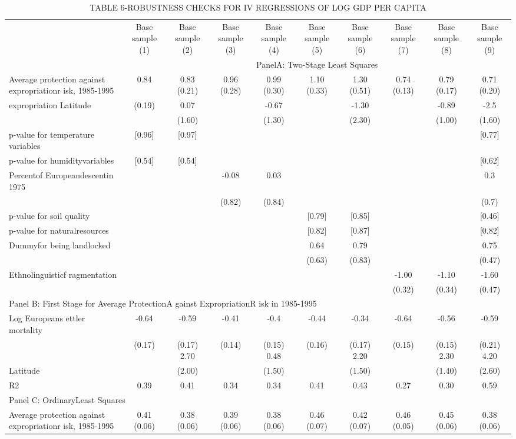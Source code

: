 \begin{table}[htbp]
\centering
\caption{TABLE  6-ROBUSTNESS CHECKS  FOR  IV REGRESSIONS OF LOG GDP PER  CAPITA}
\begin{tabular}{lccccccccc}
\hline
 & Base sample (1) & Base sample (2) & Base sample (3) & Base sample (4) & Base sample (5) & Base sample (6) & Base sample (7) & Base sample (8) & Base sample (9) \\
 & \multicolumn{9}{c}{PanelA: Two-Stage Least Squares} \\
Average protection against expropriationr isk, 1985-1995 & 0.84 & 0.83 (0.21) & 0.96 (0.28) & 0.99 (0.30) & 1.10 (0.33) & 1.30 (0.51) & 0.74 (0.13) & 0.79 (0.17) & 0.71 (0.20) \\
expropriation Latitude & (0.19) & 0.07 &  & -0.67 &  & -1.30 &  & -0.89 & -2.5 \\
 &  & (1.60) &  & (1.30) &  & (2.30) &  & (1.00) & (1.60) \\
p-value for temperature variables & [0.96] & [0.97] &  &  &  &  &  &  & [0.77] \\
p-value for humidityvariables & [0.54] & [0.54] &  &  &  &  &  &  & [0.62] \\
Percentof Europeandescentin 1975 &  &  & -0.08 & 0.03 &  &  &  &  & 0.3 \\
 &  &  & (0.82) & (0.84) &  &  &  &  & (0.7) \\
p-value for soil quality &  &  &  &  & [0.79] & [0.85] &  &  & [0.46] \\
p-value for naturalresources &  &  &  &  & [0.82] & [0.87] &  &  & [0.82] \\
Dummyfor being landlocked &  &  &  &  & 0.64 & 0.79 &  &  & 0.75 \\
 &  &  &  &  & (0.63) & (0.83) &  &  & (0.47) \\
Ethnolinguisticf ragmentation &  &  &  &  &  &  & -1.00 & -1.10 & -1.60 \\
 &  &  &  &  &  &  & (0.32) & (0.34) & (0.47) \\
\multicolumn{10}{l}{Panel B: First Stage for Average ProtectionA gainst ExpropriationR isk in 1985-1995} \\
Log Europeans ettler mortality & -0.64 & -0.59 & -0.41 & -0.4 & -0.44 & -0.34 & -0.64 & -0.56 & -0.59 \\
 & (0.17) & (0.17) 2.70 & (0.14) & (0.15) 0.48 & (0.16) & (0.17) 2.20 & (0.15) & (0.15) 2.30 & (0.21) 4.20 \\
Latitude &  & (2.00) &  & (1.50) &  & (1.50) &  & (1.40) & (2.60) \\
R2 & 0.39 & 0.41 & 0.34 & 0.34 & 0.41 & 0.43 & 0.27 & 0.30 & 0.59 \\
\multicolumn{10}{l}{Panel C: OrdinaryLeast Squares} \\
Average protection against expropriationr isk, 1985-1995 & 0.41 (0.06) & 0.38 (0.06) & 0.39 (0.06) & 0.38 (0.06) & 0.46 (0.07) & 0.42 (0.07) & 0.46 (0.05) & 0.45 (0.06) & 0.38 (0.06) \\
\hline
\end{tabular}
\end{table}
